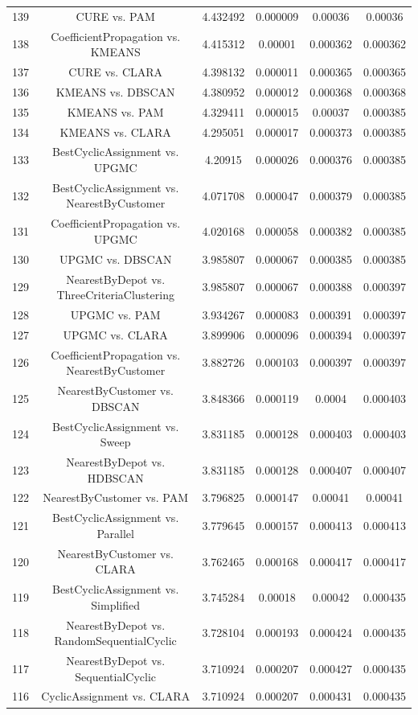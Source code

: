 \documentclass[a4paper,10pt]{article}
\begin{document}
\begin{landscape}
\begin{table}[!htp]
\begin{tabular}{cccccc}
139&CURE vs. PAM&4.432492&0.000009&0.00036&0.00036\\
138&CoefficientPropagation vs. KMEANS&4.415312&0.00001&0.000362&0.000362\\
137&CURE vs. CLARA&4.398132&0.000011&0.000365&0.000365\\
136&KMEANS vs. DBSCAN&4.380952&0.000012&0.000368&0.000368\\
135&KMEANS vs. PAM&4.329411&0.000015&0.00037&0.000385\\
134&KMEANS vs. CLARA&4.295051&0.000017&0.000373&0.000385\\
133&BestCyclicAssignment vs. UPGMC&4.20915&0.000026&0.000376&0.000385\\
132&BestCyclicAssignment vs. NearestByCustomer&4.071708&0.000047&0.000379&0.000385\\
131&CoefficientPropagation vs. UPGMC&4.020168&0.000058&0.000382&0.000385\\
130&UPGMC vs. DBSCAN&3.985807&0.000067&0.000385&0.000385\\
129&NearestByDepot vs. ThreeCriteriaClustering&3.985807&0.000067&0.000388&0.000397\\
128&UPGMC vs. PAM&3.934267&0.000083&0.000391&0.000397\\
127&UPGMC vs. CLARA&3.899906&0.000096&0.000394&0.000397\\
126&CoefficientPropagation vs. NearestByCustomer&3.882726&0.000103&0.000397&0.000397\\
125&NearestByCustomer vs. DBSCAN&3.848366&0.000119&0.0004&0.000403\\
124&BestCyclicAssignment vs. Sweep&3.831185&0.000128&0.000403&0.000403\\
123&NearestByDepot vs. HDBSCAN&3.831185&0.000128&0.000407&0.000407\\
122&NearestByCustomer vs. PAM&3.796825&0.000147&0.00041&0.00041\\
121&BestCyclicAssignment vs. Parallel&3.779645&0.000157&0.000413&0.000413\\
120&NearestByCustomer vs. CLARA&3.762465&0.000168&0.000417&0.000417\\
119&BestCyclicAssignment vs. Simplified&3.745284&0.00018&0.00042&0.000435\\
118&NearestByDepot vs. RandomSequentialCyclic&3.728104&0.000193&0.000424&0.000435\\
117&NearestByDepot vs. SequentialCyclic&3.710924&0.000207&0.000427&0.000435\\
116&CyclicAssignment vs. CLARA&3.710924&0.000207&0.000431&0.000435\\

\end{tabular}
\end{table}
\end{landscape}
\end{document}
